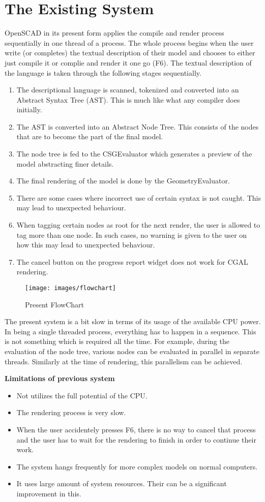 \section{The Existing System}
OpenSCAD in its present form applies the compile and render process sequentially in one thread of a process. The whole process begins when the user write (or completes) the textual description of their model and chooses to either just compile it or complie and render it one go (F6). The textual description of the language is taken through the following stages sequentially.
\begin{enumerate}
	\item The descriptional language is scanned, tokenized and converted into an Abstract Syntax Tree (AST). This is much like what any compiler does initially.
	\item The AST is converted into an Abstract Node Tree. This consists of the nodes that are to become the part of the final model.
	\item The node tree is fed to the CSGEvaluator which generates a preview of the model abstracting finer details.
	\item The final rendering of the model is done by the GeometryEvaluator.
	\item There are some cases where incorrect use of certain syntax is not caught. This may lead to unexpected behaviour.
	\item When tagging certain nodes as root for the next render, the user is allowed to tag more than one node. In such cases, no warning is given to the user on how this may lead to unexpected behaviour.
	\item The cancel button on the progress report widget does not work for CGAL rendering.
\end{enumerate}

\begin{figure}[H]
\centering
\texttt{[image: images/flowchart]}
\caption{Present FlowChart}
\label{fig:flowchart}
\end{figure}

The present system is a bit slow in terms of its usage of the available CPU power. In being a single threaded process, everything has to happen in a sequence. This is not something which is required all the time. For example, during the evaluation of the node tree, various nodes can be evaluated in parallel in separate threads. Similarly at the time of rendering, this parallelism can be achieved.

{\bf {Limitations of previous system }}
\begin{itemize}
	\item Not utilizes the full potential of the CPU.
	\item The rendering process is very slow.
	\item When the user accidentely presses F6, there is no way to cancel that process and the user has to wait for the rendering to finish in order to continue their work.
	\item The system hangs frequently for more complex models on normal computers.
	\item It uses large amount of system resources. Their can be a significant improvement in this.
\end{itemize}
